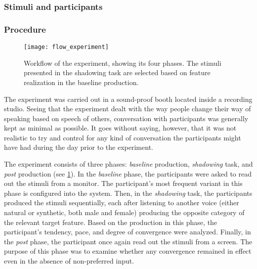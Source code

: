 

\subsubsection{Stimuli and participants}
\label{subsubsec:stimuli_participant_hci}


\subsubsection{Procedure}
\label{subsubsec:procedure_hci}

\begin{figure}[!t]
	\centering
	\texttt{[image: flow\_experiment]}
	\caption[\acs{hci} convergence experiment workflow]{Workflow of the experiment, showing its four phases. The stimuli presented in the shadowing task are selected based on feature realization in the baseline production.}
	\label{fig:HCIConvFlow}
\end{figure}

The experiment was carried out in a sound-proof booth located inside a recording studio.
Seeing that the experiment dealt with the way people change their way of speaking based on speech of others, conversation with participants was generally kept as minimal as possible.
It goes without saying, however, that it was not realistic to try and control for any kind of conversation the participants might have had during the day prior to the experiment.


The experiment consists of three phases: \emph{baseline} production, \emph{shadowing} task, and \emph{post} production (see \cref{fig:HCIConvFlow}).
In the \emph{baseline} phase, the participants were asked to read out the stimuli from a monitor.
The participant's most frequent variant in this phase is configured into the system.
Then, in the \emph{shadowing} task, the participants produced the stimuli sequentially, each after listening to another voice (either natural or synthetic, both male and female) producing the opposite category of the relevant target feature.
Based on the production in this phase, the participant's tendency, pace, and degree of convergence were analyzed.
Finally, in the \emph{post} phase, the participant once again read out the stimuli from a screen.
The purpose of this phase was to examine whether any convergence remained in effect even in the absence of non-preferred input.

